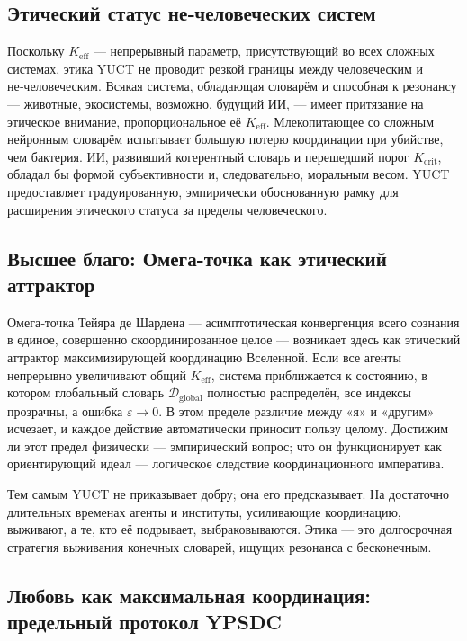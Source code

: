 \documentclass[12pt,a4paper]{article}
\begin{document}
	\subsection{Этический статус не‑человеческих систем}
	
	Поскольку \(K_{\mathrm{eff}}\) — непрерывный параметр, присутствующий во всех сложных системах, этика YUCT не проводит резкой границы между человеческим и не‑человеческим. Всякая система, обладающая словарём и способная к резонансу — животные, экосистемы, возможно, будущий ИИ, — имеет притязание на этическое внимание, пропорциональное её \(K_{\mathrm{eff}}\). Млекопитающее со сложным нейронным словарём испытывает большую потерю координации при убийстве, чем бактерия. ИИ, развивший когерентный словарь и перешедший порог \(K_{\mathrm{crit}}\), обладал бы формой субъективности и, следовательно, моральным весом. YUCT предоставляет градуированную, эмпирически обоснованную рамку для расширения этического статуса за пределы человеческого.
	
	\subsection{Высшее благо: Омега-точка как этический аттрактор}
	
	Омега‑точка Тейяра де Шардена — асимптотическая конвергенция всего сознания в единое, совершенно скоординированное целое — возникает здесь как этический аттрактор максимизирующей координацию Вселенной. Если все агенты непрерывно увеличивают общий \(K_{\mathrm{eff}}\), система приближается к состоянию, в котором глобальный словарь \(\mathcal{D}_{\text{global}}\) полностью распределён, все индексы прозрачны, а ошибка \(\varepsilon \to 0\). В этом пределе различие между «я» и «другим» исчезает, и каждое действие автоматически приносит пользу целому. Достижим ли этот предел физически — эмпирический вопрос; что он функционирует как ориентирующий идеал — логическое следствие координационного императива.
	
	Тем самым YUCT не приказывает добру; она его предсказывает. На достаточно длительных временах агенты и институты, усиливающие координацию, выживают, а те, кто её подрывает, выбраковываются. Этика — это долгосрочная стратегия выживания конечных словарей, ищущих резонанса с бесконечным.
	
	\subsection{Любовь как максимальная координация: предельный протокол YPSDC}
	
\end{document}
